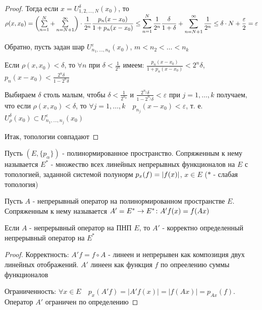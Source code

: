 \documentclass[a4paper,12pt]{report}
\newcommand*{\hm}[1]{#1\nobreak\discretionary{}%
            {\hbox{$\mathsurround=0pt #1$}}{}}
\begin{document}
\begin{proof}
Тогда если $x=U_{1,2,\ldots,N}^\delta(x_0)$, то $\rho(x,x_0)=\left(\sum\limits_{n=1}^N+\sum\limits_{n=N+1}^\infty\right)\cdot\displaystyle\frac{1}{2^n}\displaystyle\frac{p_n(x-x_0)}{1+p_n(x-x_0)}\hm\le\sum\limits_{n=1}^N\displaystyle\frac1{2^n}\frac\delta{1+\delta}+\sum\limits_{n=N+1}^\infty\displaystyle\frac1{2^n}\le\delta\cdot N+\displaystyle\frac\varepsilon2=\varepsilon$

Обратно, пусть задан шар $U_{n_1,\ldots,n_k}^\varepsilon(x_0)$, $m<n_2<\ldots<n_k$

Если $\rho(x,x_0)<\delta$, то $\forall n$ при $\delta<\displaystyle\frac1{2^n}$ имеем: $\displaystyle\frac{p_n(x-x_0)}{1+p_n(x-x_0)}<2^n\delta$,\\$p_n(x-x_0)<\displaystyle\frac{2^n\delta}{1-2^n\delta}$

Выбираем $\delta$ столь малым, чтобы $\delta<\displaystyle\frac1{2^{n_k}}$ и $\displaystyle\frac{2^{n_j}\delta}{1-2^{n_j}\delta}<\varepsilon$ при $j=1,\ldots,k$ получаем, что если $\rho(x,x_0)<\delta$, то $\forall j=1,\ldots,k\quad p_{n_j}(x-x_0)<\varepsilon$, т. е. $U_\rho^\delta(x_0)\subset U_{n_1,\ldots,n_j}^\varepsilon(x_0)$

Итак, топологии совпадают
\end{proof}
 


\begin{df}
Пусть $(E,\{p_\alpha\})$ - полинормированное пространство. Сопряженным к нему называется $E^*$ - множество всех линейных непрерывных функционалов на $E$ с топологией, заданной системой полунорм $p_x(f)\hm=|f(x)|$, $x\in E$ ($*$ - слабая топология)
\end{df}
 

\begin{df}
Пусть $A$ - непрерывный оператор на полинормированном пространстве $E$. Сопряженным к нему называется $A'=E^*\to E^*\colon A'f(x)\hm=f(Ax)$
\end{df}
 


\begin{prop}
Если $A$ - непрерывный оператор на ПНП $E$, то $A'$ - корректно определенный непрерывный оператор на $E^*$ 
\end{prop}
\begin{proof}
Корректность: $A'f=f\circ A$ - линеен и непрерывен как композиция двух линейных отображений. $A'$ линеен как функция $f$ по опреелению суммы функционалов

Ограниченность: $\forall x\in E\quad p_x(A'f)=|A'f(x)|=|f(Ax)|=p_{Ax}(f)$. Оператор $A'$ ограничен по определению
\end{proof}
\end{document}
